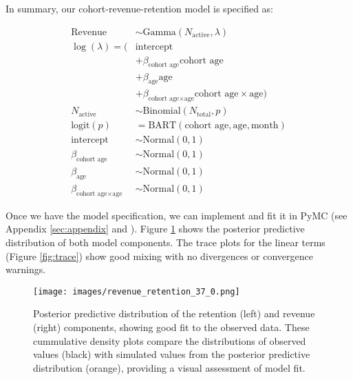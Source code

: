 \documentclass[11pt]{amsart}
\theoremstyle{definition}
\begin{document}
In summary, our cohort-revenue-retention model is specified as:

\begin{align*}
    \text{Revenue}                              & \sim \text{Gamma}(N_{\text{active}}, \lambda)                                      \\
    \log(\lambda) = (                           & \text{intercept}                                                                   \\
                                                & + \beta_{\text{cohort age}} \text{cohort age}                                      \\
                                                & + \beta_{\text{age}} \text{age}                                                    \\
                                                & + \beta_{\text{cohort age} \times \text{age}} \text{cohort age} \times \text{age}) \\
    N_{\text{active}}                           & \sim \text{Binomial}(N_{\text{total}}, p)                                          \\
    \textrm{logit}(p)                           & = \text{BART}(\text{cohort age}, \text{age}, \text{month})                         \\
    \text{intercept}                            & \sim \text{Normal}(0, 1)                                                           \\
    \beta_{\text{cohort age}}                   & \sim \text{Normal}(0, 1)                                                           \\
    \beta_{\text{age}}                          & \sim \text{Normal}(0, 1)                                                           \\
    \beta_{\text{cohort age} \times \text{age}} & \sim \text{Normal}(0, 1)
\end{align*}

Once we have the model specification, we can implement and fit it in PyMC (see Appendix \ref{sec:appendix} and
\cite{orduz_revenue_retention}). Figure \ref{fig:posterior_predictive} shows the posterior predictive distribution of both
model components. The trace plots for the linear terms (Figure \ref{fig:trace}) show good mixing with no divergences or
convergence warnings.

\begin{figure}
    \centering
    \texttt{[image: images/revenue\_retention\_37\_0.png]}
    \caption{Posterior predictive distribution of the retention (left) and revenue (right) components, showing good fit to
        the observed data. These cummulative density plots compare the distributions of observed values (black) with simulated
        values from the posterior predictive distribution (orange), providing a visual assessment of model fit.}
    \label{fig:posterior_predictive}
\end{figure}
\end{document}
